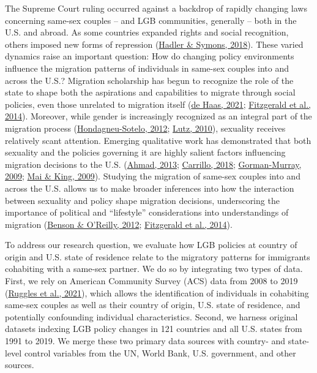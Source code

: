 \documentclass[
  12pt,
]{article}
\begin{document}
The Supreme Court ruling occurred against a backdrop of rapidly changing laws concerning same-sex couples -- and LGB communities, generally -- both in the U.S. and abroad. As some countries expanded rights and social recognition, others imposed new forms of repression (\protect\hyperlink{ref-hadler_2018_world}{Hadler \& Symons, 2018}). These varied dynamics raise an important question: How do changing policy environments influence the migration patterns of individuals in same-sex couples into and across the U.S.? Migration scholarship has begun to recognize the role of the state to shape both the aspirations and capabilities to migrate through social policies, even those unrelated to migration itself (\protect\hyperlink{ref-dehaas_2021}{de Haas, 2021}; \protect\hyperlink{ref-fitzgerald_2014}{Fitzgerald et al., 2014}). Moreover, while gender is increasingly recognized as an integral part of the migration process (\protect\hyperlink{ref-hondagneu-sotelo_2012}{Hondagneu-Sotelo, 2012}; \protect\hyperlink{ref-lutz_2010}{Lutz, 2010}), sexuality receives relatively scant attention. Emerging qualitative work has demonstrated that both sexuality and the policies governing it are highly salient factors influencing migration decisions to the U.S. (\protect\hyperlink{ref-ahmad_2013}{Ahmad, 2013}; \protect\hyperlink{ref-carrillo_2018}{Carrillo, 2018}; \protect\hyperlink{ref-gorman-murray_2009}{Gorman-Murray, 2009}; \protect\hyperlink{ref-mai_2009}{Mai \& King, 2009}). Studying the migration of same-sex couples into and across the U.S. allows us to make broader inferences into how the interaction between sexuality and policy shape migration decisions, underscoring the importance of political and ``lifestyle'' considerations into understandings of migration (\protect\hyperlink{ref-benson_2012}{Benson \& O'Reilly, 2012}; \protect\hyperlink{ref-fitzgerald_2014}{Fitzgerald et al., 2014}).

To address our research question, we evaluate how LGB policies at country of origin and U.S. state of residence relate to the migratory patterns for immigrants cohabiting with a same-sex partner. We do so by integrating two types of data. First, we rely on American Community Survey (ACS) data from 2008 to 2019 (\protect\hyperlink{ref-ruggles_2021}{Ruggles et al., 2021}), which allows the identification of individuals in cohabiting same-sex couples as well as their country of origin, U.S. state of residence, and potentially confounding individual characteristics. Second, we harness original datasets indexing LGB policy changes in 121 countries and all U.S. states from 1991 to 2019. We merge these two primary data sources with country- and state-level control variables from the UN, World Bank, U.S. government, and other sources.
\end{document}
